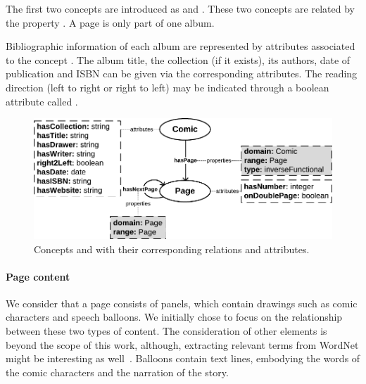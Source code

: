 The first two concepts are introduced as  and .
These two concepts are related by the property .
A page is only part of one album.

Bibliographic information of each album are represented by attributes associated to the concept .
The album title, the collection (if it exists), its authors, date of publication and ISBN can be given via the corresponding attributes.
The reading direction (left to right or right to left) may be indicated through a boolean attribute called .

\begin{figure}[h!]
\begin{center}
\includegraphics[width=1\textwidth]{model_step1.pdf}
\caption[Initial comics model]{Concepts  and  with their corresponding relations and attributes.}
\label{fig:model_d_1}
\end{center}
\end{figure}

\paragraph{Page content} %
\label{par:page_content}

We consider that a page consists of panels, which contain drawings such as comic characters and speech balloons.
We initially chose to focus on the relationship between these two types of content.
The consideration of other elements is beyond the scope of this work, although, extracting relevant terms from WordNet might be interesting as well~\cite{Zinger05extracting}.
Balloons contain text lines, embodying the words of the comic characters and the narration of the story.

